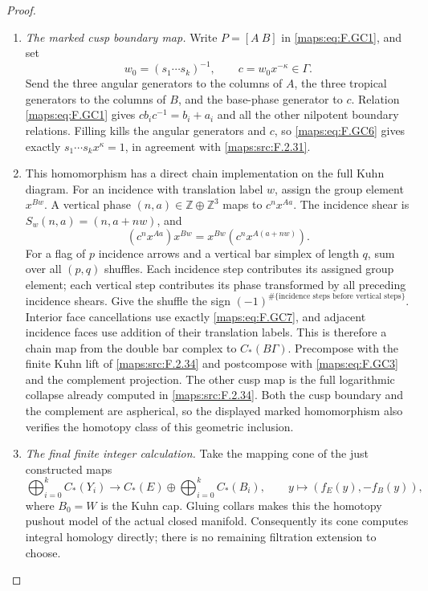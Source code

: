 \begin{proof}
\begin{enumerate}[label=\arabic*.]
\item \emph{The marked cusp boundary map.}
Write $P=[A\ B]$ in \eqref{maps:eq:F.GC1}, and set
\[
 w_0=(s_1\cdots s_k)^{-1},\qquad
 c=w_0x^{-\kappa}\in\Gamma.
                                                               \tag{F.GC6}\label{maps:eq:F.GC6}
\]
Send the three angular generators to the columns of $A$,
the three tropical generators to the columns of $B$, and
the base-phase generator to $c$.  Relation \eqref{maps:eq:F.GC1} gives
$c b_i c^{-1}=b_i+a_i$ and all the other nilpotent boundary
relations.  Filling kills the angular generators and $c$,
so \eqref{maps:eq:F.GC6} gives exactly
$s_1\cdots s_kx^\kappa=1$, in agreement with \ref{maps:src:F.2.31}.

\item This homomorphism has a direct chain implementation on the
full Kuhn diagram.  For an incidence with translation label
$w$, assign the group element $x^{Bw}$.  A vertical phase
$(n,a)\in\mathbb Z\oplus\mathbb Z^3$ maps to $c^nx^{Aa}$.
The incidence shear is $S_w(n,a)=(n,a+n w)$, and
\[
 (c^nx^{Aa})x^{Bw}=x^{Bw}(c^nx^{A(a+n w)}).                \tag{F.GC7}\label{maps:eq:F.GC7}
\]
For a flag of $p$ incidence arrows and a vertical bar
simplex of length $q$, sum over all $(p,q)$ shuffles.
Each incidence step contributes its assigned group element;
each vertical step contributes its phase transformed by
all preceding incidence shears.  Give the shuffle the sign
$(-1)^{\#\{\text{incidence steps before vertical steps}\}}$.
Interior face cancellations use exactly \eqref{maps:eq:F.GC7}, and adjacent
incidence faces use addition of their translation labels.
This is therefore a chain map from the double bar complex
to $C_*(B\Gamma)$.  Precompose with the finite Kuhn lift of
\ref{maps:src:F.2.34} and postcompose with \eqref{maps:eq:F.GC3} and the complement
projection.  The other cusp map is the full logarithmic
collapse already computed in \ref{maps:src:F.2.34}.
Both the cusp boundary and the complement are aspherical,
so the displayed marked homomorphism also verifies the
homotopy class of this geometric inclusion.

\item \emph{The final finite integer calculation.}
Take the mapping cone of the just constructed maps
\[
 \bigoplus_{i=0}^k C_*(Y_i)\longrightarrow
 C_*(E)\oplus\bigoplus_{i=0}^k C_*(B_i),
 \qquad y\longmapsto(f_E(y),-f_B(y)),                     \tag{F.GC8}\label{maps:eq:F.GC8}
\]
where $B_0=W$ is the Kuhn cap.  Gluing collars makes this
the homotopy pushout model of the actual closed manifold.
Consequently its cone computes integral homology directly;
there is no remaining filtration extension to choose.


\end{enumerate}
\end{proof}
